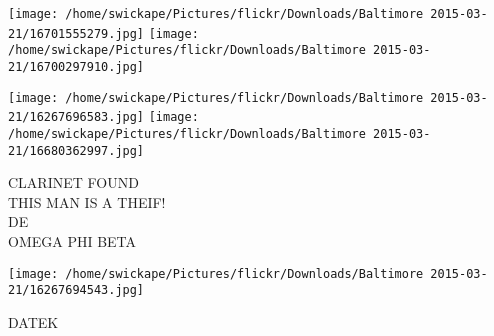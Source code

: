 \documentclass[10pt,letterpaper]{article}
\begin{document}
\texttt{[image: /home/swickape/Pictures/flickr/Downloads/Baltimore 2015-03-21/16701555279.jpg]}
\texttt{[image: /home/swickape/Pictures/flickr/Downloads/Baltimore 2015-03-21/16700297910.jpg]}

\texttt{[image: /home/swickape/Pictures/flickr/Downloads/Baltimore 2015-03-21/16267696583.jpg]}
\texttt{[image: /home/swickape/Pictures/flickr/Downloads/Baltimore 2015-03-21/16680362997.jpg]}

CLARINET FOUND\\
THIS MAN IS A THEIF!\\
DE\\
OMEGA PHI BETA\\
\pagebreak

\texttt{[image: /home/swickape/Pictures/flickr/Downloads/Baltimore 2015-03-21/16267694543.jpg]}

DATEK\\
\pagebreak
\end{document}
